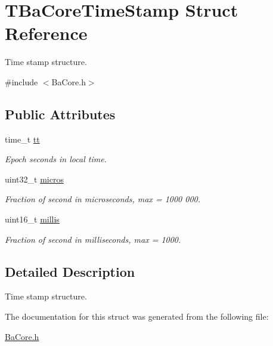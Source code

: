 \hypertarget{structTBaCoreTimeStamp}{}\section{T\+Ba\+Core\+Time\+Stamp Struct Reference}
\label{structTBaCoreTimeStamp}


Time stamp structure.  




{\ttfamily \#include $<$Ba\+Core.\+h$>$}

\subsection*{Public Attributes}
\begin{DoxyCompactItemize}
\item 
\hypertarget{structTBaCoreTimeStamp_abcb409eaa16b055c47149b1f026cb8a7}{}time\+\_\+t \hyperlink{structTBaCoreTimeStamp_abcb409eaa16b055c47149b1f026cb8a7}{tt}\label{structTBaCoreTimeStamp_abcb409eaa16b055c47149b1f026cb8a7}

\begin{DoxyCompactList}\small\item\em Epoch seconds in local time. \end{DoxyCompactList}\item 
\hypertarget{structTBaCoreTimeStamp_ae2b1c1ce27cdd45036d1b1f4fd399ef5}{}uint32\+\_\+t \hyperlink{structTBaCoreTimeStamp_ae2b1c1ce27cdd45036d1b1f4fd399ef5}{micros}\label{structTBaCoreTimeStamp_ae2b1c1ce27cdd45036d1b1f4fd399ef5}

\begin{DoxyCompactList}\small\item\em Fraction of second in microseconds, max = 1000 000. \end{DoxyCompactList}\item 
\hypertarget{structTBaCoreTimeStamp_ade3fff632e69aeabddc36cbafdb271f3}{}uint16\+\_\+t \hyperlink{structTBaCoreTimeStamp_ade3fff632e69aeabddc36cbafdb271f3}{millis}\label{structTBaCoreTimeStamp_ade3fff632e69aeabddc36cbafdb271f3}

\begin{DoxyCompactList}\small\item\em Fraction of second in milliseconds, max = 1000. \end{DoxyCompactList}\end{DoxyCompactItemize}


\subsection{Detailed Description}
Time stamp structure. 

The documentation for this struct was generated from the following file\+:\begin{DoxyCompactItemize}
\item 
\hyperlink{BaCore_8h}{Ba\+Core.\+h}\end{DoxyCompactItemize}
